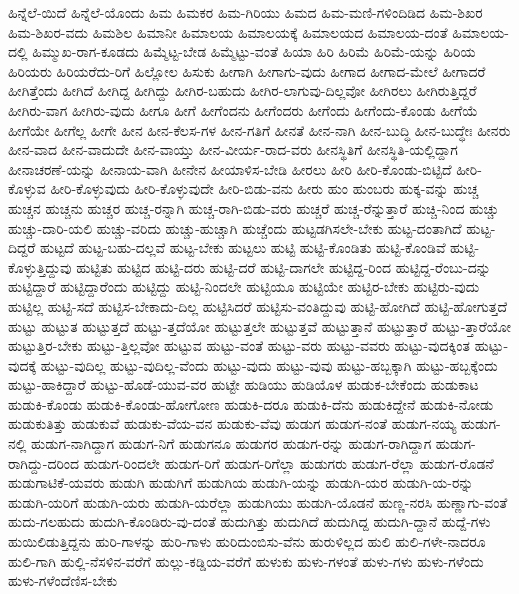 {ಹಿನ್ನೆಲೆ-ಯಿದೆ
ಹಿನ್ನೆಲೆ-ಯೊಂದು
ಹಿಮ
ಹಿಮಕರ
ಹಿಮ-ಗಿರಿಯು
ಹಿಮದ
ಹಿಮ-ಮಣಿ-ಗಳಿಂದಿಡಿದ
ಹಿಮ-ಶಿಖರ
ಹಿಮ-ಶಿಖರ-ವದು
ಹಿಮಶಿಲ
ಹಿಮಾನೀ
ಹಿಮಾಲಯ
ಹಿಮಾಲಯಕ್ಕೆ
ಹಿಮಾಲಯದ
ಹಿಮಾಲಯ-ದಂತೆ
ಹಿಮಾಲಯ-ದಲ್ಲಿ
ಹಿಮ್ಮುಖ-ರಾಗ-ಕೂಡದು
ಹಿಮ್ಮೆಟ್ಟ-ಬೇಡ
ಹಿಮ್ಮೆಟ್ಟು-ವಂತೆ
ಹಿಯಾ
ಹಿರಿ
ಹಿರಿಮೆ
ಹಿರಿಮೆ-ಯನ್ನು
ಹಿರಿಯ
ಹಿರಿಯರು
ಹಿರಿಯರೆದು-ರಿಗೆ
ಹಿಲ್ಲೋಲ
ಹಿಸುಕು
ಹೀಗಾಗಿ
ಹೀಗಾಗು-ವುದು
ಹೀಗಾದ
ಹೀಗಾದ-ಮೇಲೆ
ಹೀಗಾದರೆ
ಹೀಗಿತ್ತೆಂದು
ಹೀಗಿದೆ
ಹೀಗಿದ್ದ
ಹೀಗಿದ್ದು
ಹೀಗಿರ-ಬಹುದು
ಹೀಗಿರ-ಲಾಗುವು-ದಿಲ್ಲವೋ
ಹೀಗಿರಲು
ಹೀಗಿರುತ್ತಿದ್ದರೆ
ಹೀಗಿರು-ವಾಗ
ಹೀಗಿರು-ವುದು
ಹೀಗೂ
ಹೀಗೆ
ಹೀಗೆಂದನು
ಹೀಗೆಂದರು
ಹೀಗೆಂದು
ಹೀಗೆಂದು-ಕೊಂಡು
ಹೀಗೆಯೆ
ಹೀಗೆಯೇ
ಹೀಗೆಲ್ಲ
ಹೀಗೇ
ಹೀನ
ಹೀನ-ಕೆಲಸ-ಗಳ
ಹೀನ-ಗತಿಗೆ
ಹೀನತೆ
ಹೀನ-ನಾಗಿ
ಹೀನ-ಬುದ್ಧಿ
ಹೀನ-ಬುದ್ಧೇಃ
ಹೀನರು
ಹೀನ-ವಾದ
ಹೀನ-ವಾದುದೇ
ಹೀನ-ವಾಯ್ತು
ಹೀನ-ವೀರ್ಯ-ರಾದ-ವರು
ಹೀನಸ್ಥಿತಿಗೆ
ಹೀನಸ್ಥಿತಿ-ಯಲ್ಲಿದ್ದಾಗ
ಹೀನಾಚರಣೆ-ಯನ್ನು
ಹೀನಾಯ-ವಾಗಿ
ಹೀನೇನ
ಹೀಯಾಳಿಸ-ಬೇಡಿ
ಹೀರಲು
ಹೀರಿ
ಹೀರಿ-ಕೊಂಡು-ಬಿಟ್ಟಿದೆ
ಹೀರಿ-ಕೊಳ್ಳುವ
ಹೀರಿ-ಕೊಳ್ಳುವುದು
ಹೀರಿ-ಕೊಳ್ಳುವುದೇ
ಹೀರಿ-ಬಿಡು-ವನು
ಹೀರು
ಹುಂ
ಹುಂಬರು
ಹುಕ್ಕ-ವನ್ನು
ಹುಚ್ಚ
ಹುಚ್ಚನ
ಹುಚ್ಚನು
ಹುಚ್ಚರ
ಹುಚ್ಚ-ರನ್ನಾಗಿ
ಹುಚ್ಚ-ರಾಗಿ-ಬಿಡು-ವರು
ಹುಚ್ಚರೆ
ಹುಚ್ಚ-ರೆನ್ನುತ್ತಾರೆ
ಹುಚ್ಚಿ-ನಿಂದ
ಹುಚ್ಚು
ಹುಚ್ಚು-ದಾರಿ-ಯಲಿ
ಹುಚ್ಚು-ವರಿದು
ಹುಚ್ಚು-ಹುಚ್ಚಾಗಿ
ಹುಚ್ಚೆಂದು
ಹುಟ್ಟಡಗಿಸಲೇ-ಬೇಕು
ಹುಟ್ಟ-ದಂತಾಗಿದೆ
ಹುಟ್ಟ-ದಿದ್ದರೆ
ಹುಟ್ಟದೆ
ಹುಟ್ಟ-ಬಹು-ದಲ್ಲವೆ
ಹುಟ್ಟ-ಬೇಕು
ಹುಟ್ಟಲು
ಹುಟ್ಟಿ
ಹುಟ್ಟಿ-ಕೊಂಡಿತು
ಹುಟ್ಟಿ-ಕೊಂಡಿವೆ
ಹುಟ್ಟಿ-ಕೊಳ್ಳುತ್ತಿದ್ದುವು
ಹುಟ್ಟಿತು
ಹುಟ್ಟಿದ
ಹುಟ್ಟಿ-ದರು
ಹುಟ್ಟಿ-ದರೆ
ಹುಟ್ಟಿ-ದಾಗಲೇ
ಹುಟ್ಟಿದ್ದ-ರಿಂದ
ಹುಟ್ಟಿದ್ದ-ರೆಂಬು-ದನ್ನು
ಹುಟ್ಟಿದ್ದಾರೆ
ಹುಟ್ಟಿದ್ದಾರೆಂದು
ಹುಟ್ಟಿದ್ದು
ಹುಟ್ಟಿ-ನಿಂದಲೇ
ಹುಟ್ಟಿಯೂ
ಹುಟ್ಟಿಯೇ
ಹುಟ್ಟಿರ-ಬೇಕು
ಹುಟ್ಟಿರು-ವುದು
ಹುಟ್ಟಿಲ್ಲ
ಹುಟ್ಟಿ-ಸದೆ
ಹುಟ್ಟಿಸ-ಬೇಕಾದು-ದಿಲ್ಲ
ಹುಟ್ಟಿಸಿದರೆ
ಹುಟ್ಟಿಸು-ವಂತಿದ್ದುವು
ಹುಟ್ಟಿ-ಹೋಗಿದೆ
ಹುಟ್ಟಿ-ಹೋಗುತ್ತದೆ
ಹುಟ್ಟು
ಹುಟ್ಟುತ
ಹುಟ್ಟುತ್ತದೆ
ಹುಟ್ಟು-ತ್ತದೆಯೋ
ಹುಟ್ಟುತ್ತಲೇ
ಹುಟ್ಟುತ್ತವೆ
ಹುಟ್ಟುತ್ತಾನೆ
ಹುಟ್ಟುತ್ತಾರೆ
ಹುಟ್ಟು-ತ್ತಾರೆಯೋ
ಹುಟ್ಟುತ್ತಿರ-ಬೇಕು
ಹುಟ್ಟು-ತ್ತಿಲ್ಲವೋ
ಹುಟ್ಟುವ
ಹುಟ್ಟು-ವಂತೆ
ಹುಟ್ಟು-ವರು
ಹುಟ್ಟು-ವವರು
ಹುಟ್ಟು-ವುದಕ್ಕಿಂತ
ಹುಟ್ಟು-ವುದಕ್ಕೆ
ಹುಟ್ಟು-ವುದಿಲ್ಲ
ಹುಟ್ಟು-ವುದಿಲ್ಲ-ವೆಂದು
ಹುಟ್ಟು-ವುದು
ಹುಟ್ಟು-ವುವು
ಹುಟ್ಟು-ಹಬ್ಬಕ್ಕಾಗಿ
ಹುಟ್ಟು-ಹಬ್ಬಕ್ಕೆಂದು
ಹುಟ್ಟು-ಹಾಕಿದ್ದಾರೆ
ಹುಟ್ಟು-ಹೊಡೆ-ಯುವ-ವರ
ಹುಟ್ಟೇ
ಹುಡಿಯು
ಹುಡಿಯೊಳ
ಹುಡುಕ-ಬೇಕೆಂದು
ಹುಡುಕಾಟ
ಹುಡುಕಿ-ಕೊಂಡು
ಹುಡುಕಿ-ಕೊಂಡು-ಹೋಗೋಣ
ಹುಡುಕಿ-ದರೂ
ಹುಡುಕಿ-ದೆನು
ಹುಡುಕಿದ್ದೇನೆ
ಹುಡುಕಿ-ನೋಡು
ಹುಡುಕುತಿತ್ತು
ಹುಡುಕುವೆ
ಹುಡುಕು-ವೆಯ-ವನ
ಹುಡುಕು-ವೆವು
ಹುಡುಗ
ಹುಡುಗ-ನಂತೆ
ಹುಡುಗ-ನಯ್ಯ
ಹುಡುಗ-ನಲ್ಲಿ
ಹುಡುಗ-ನಾಗಿದ್ದಾಗ
ಹುಡುಗ-ನಿಗೆ
ಹುಡುಗನೂ
ಹುಡುಗರ
ಹುಡುಗ-ರನ್ನು
ಹುಡುಗ-ರಾಗಿದ್ದಾಗ
ಹುಡುಗ-ರಾಗಿದ್ದು-ದರಿಂದ
ಹುಡುಗ-ರಿಂದಲೇ
ಹುಡುಗ-ರಿಗೆ
ಹುಡುಗ-ರಿಗೆಲ್ಲಾ
ಹುಡುಗರು
ಹುಡುಗ-ರೆಲ್ಲಾ
ಹುಡುಗ-ರೊಡನೆ
ಹುಡುಗಾಟಿಕೆ-ಯವರು
ಹುಡುಗಿ
ಹುಡುಗಿಗೆ
ಹುಡುಗಿಯ
ಹುಡುಗಿ-ಯನ್ನು
ಹುಡುಗಿ-ಯರ
ಹುಡುಗಿ-ಯ-ರನ್ನು
ಹುಡುಗಿ-ಯರಿಗೆ
ಹುಡುಗಿ-ಯರು
ಹುಡುಗಿ-ಯರೆಲ್ಲಾ
ಹುಡುಗಿಯು
ಹುಡುಗಿ-ಯೊಡನೆ
ಹುಣ್ಣ-ನರಸಿ
ಹುಣ್ಣಾಗು-ವಂತೆ
ಹುದು-ಗಲಹುದು
ಹುದುಗಿ-ಕೊಂಡಿರು-ವು-ದಂತೆ
ಹುದುಗಿತ್ತು
ಹುದುಗಿದೆ
ಹುದುಗಿದ್ದ
ಹುದುಗಿ-ದ್ದಾನೆ
ಹುದ್ದೆ-ಗಳು
ಹುಯಿಲಿಡುತ್ತಿದ್ದನು
ಹುರಿ-ಗಾಳನ್ನು
ಹುರಿ-ಗಾಳು
ಹುರಿದುಂಬಿಸು-ವೆನು
ಹುರುಳಿಲ್ಲದ
ಹುಲಿ
ಹುಲಿ-ಗಳೇ-ನಾದರೂ
ಹುಲಿ-ಗಾಗಿ
ಹುಲ್ಲಿ-ನೆಸಳಿನ-ವರೆಗೆ
ಹುಲ್ಲು-ಕಡ್ಡಿಯ-ವರೆಗೆ
ಹುಳುಕು
ಹುಳು-ಗಳಂತೆ
ಹುಳು-ಗಳು
ಹುಳು-ಗಳೆಂದು
ಹುಳು-ಗಳೆಂದೆಣಿಸ-ಬೇಕು
}
